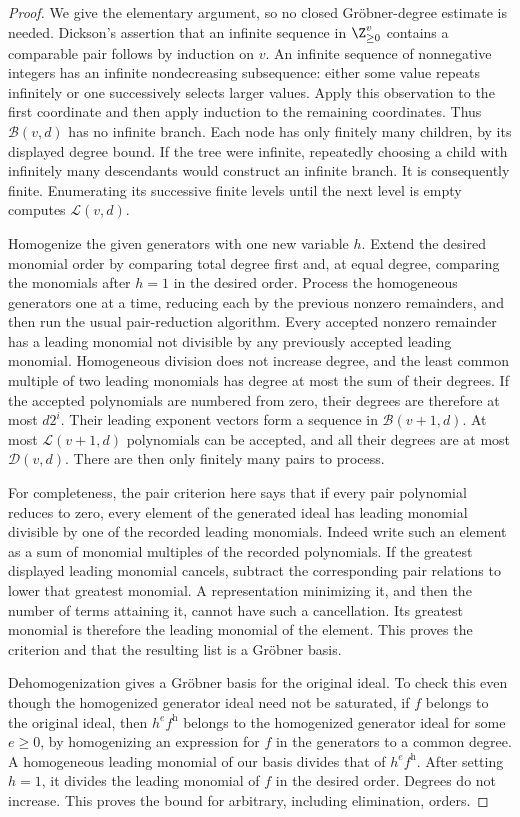 \begin{proof}
We give the elementary argument, so no closed Gr\"obner-degree
estimate is needed.  Dickson's assertion that an infinite
sequence in $\Z_{\geq0}^v$ contains a comparable pair follows
by induction on $v$.  An infinite sequence of nonnegative
integers has an infinite nondecreasing subsequence: either some
value repeats infinitely or one successively selects larger
values.  Apply this observation to the first coordinate and
then apply induction to the remaining coordinates.  Thus
$\mathcal B(v,d)$ has no infinite branch.  Each node has only
finitely many children, by its displayed degree bound.
If the tree were infinite, repeatedly choosing a child with
infinitely many descendants would construct an infinite branch.
It is consequently finite.  Enumerating its successive finite
levels until the next level is empty computes $\mathcal L(v,d)$.

Homogenize the given generators with one new variable $h$.
Extend the desired monomial order by comparing total degree
first and, at equal degree, comparing the monomials after
$h=1$ in the desired order.  Process the homogeneous generators
one at a time, reducing each by the previous nonzero remainders,
and then run the usual pair-reduction algorithm.  Every accepted
nonzero remainder has a leading monomial not divisible by any
previously accepted leading monomial.  Homogeneous division
does not increase degree, and the least common multiple of
two leading monomials has degree at most the sum of their
degrees.  If the accepted polynomials are numbered from zero,
their degrees are therefore at most $d2^i$.  Their leading
exponent vectors form a sequence in $\mathcal B(v+1,d)$.
At most $\mathcal L(v+1,d)$ polynomials can be accepted, and
all their degrees are at most $\mathcal D(v,d)$.
There are then only finitely many pairs to process.

For completeness, the pair criterion here says that if every
pair polynomial reduces to zero, every element of the generated
ideal has leading monomial divisible by one of the recorded
leading monomials.  Indeed write such an element as a sum of
monomial multiples of the recorded polynomials.  If the greatest
displayed leading monomial cancels, subtract the corresponding
pair relations to lower that greatest monomial.  A representation
minimizing it, and then the number of terms attaining it, cannot
have such a cancellation.  Its greatest monomial is therefore
the leading monomial of the element.  This proves the criterion
and that the resulting list is a Gr\"obner basis.

Dehomogenization gives a Gr\"obner basis for the original ideal.
To check this even though the homogenized generator ideal need
not be saturated, if $f$ belongs to the original ideal, then
$h^e f^{\mathrm h}$ belongs to the homogenized generator ideal
for some $e\geq0$, by homogenizing an expression for $f$ in
the generators to a common degree.  A homogeneous leading
monomial of our basis divides that of $h^e f^{\mathrm h}$.
After setting $h=1$, it divides the leading monomial of $f$
in the desired order.  Degrees do not increase.  This proves
the bound for arbitrary, including elimination, orders.
\end{proof}

